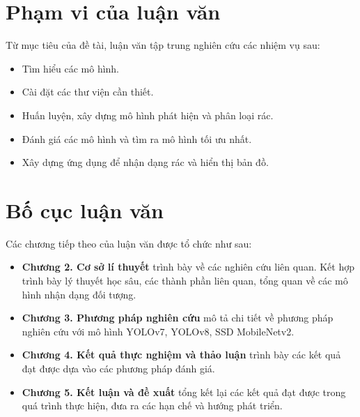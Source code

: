 \documentclass[../the.tex]{subfiles}
\begin{document}
\section{Phạm vi của luận văn}
\label{pham_vi}

{\fontsize{13}{12} \selectfont

Từ mục tiêu của đề tài, luận văn tập trung nghiên cứu các nhiệm vụ sau:

\begin{itemize}
  \item Tìm hiểu các mô hình.
  \item Cài đặt các thư viện cần thiết.
  \item Huấn luyện, xây dựng mô hình phát hiện và phân loại rác.
  \item Đánh giá các mô hình và tìm ra mô hình tối ưu nhất.
  \item Xây dựng ứng dụng để nhận dạng rác và hiển thị bản đồ.
\end{itemize}

}

\section{Bố cục luận văn}
\label{bo_cuc}

{\fontsize{13}{12} \selectfont

Các chương tiếp theo của luận văn được tổ chức như sau:

\begin{itemize}
  \item \textbf{Chương 2. Cơ sở lí thuyết} trình bày về các nghiên cứu liên quan. Kết hợp trình bày lý thuyết học sâu, các thành phần liên quan, tổng quan về các mô hình nhận dạng đối tượng.
  \item \textbf{Chương 3. Phương pháp nghiên cứu} mô tả chi tiết về phương pháp nghiên cứu với mô hình YOLOv7, YOLOv8, SSD MobileNetv2.
  \item \textbf{Chương 4. Kết quả thực nghiệm và thảo luận} trình bày các kết quả đạt được dựa vào các phương pháp đánh giá.
  \item \textbf{Chương 5. Kết luận và đề xuất} tổng kết lại các kết quả đạt được trong quá trình thực hiện, đưa ra các hạn chế và hướng phát triển.
\end{itemize}

}

\end{document}
